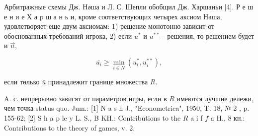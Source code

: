 \documentclass[10pt]{article}
\begin{document}
Арбитражные схемы Дж. Нәша и Л. С. Шепли обобщил Дж. Харшаньи [4]. Р е ш е н и е Х а p ш а н ь и, кроме соответствующих четырех аксиом Нәша, удовлетворяет еще двум аксиомам: 1) решение монотонно зависит от обоснованных требований игрока, 2) если $u^{*}$ и $u^{* *}$ - решения, то решением будет и $\vec{u}$,



\[

\overline{u_{i}} \geqslant \min _{i \in N}\left(u_{i}^{*}, u_{i}^{* *}\right),

\]



если төлько $\bar{u}$ принадлежит границе множества $R$.



A. с. непрерывно зависят от параметров игры, если в $R$ имеются лучшие дележи, чем точка status quo. Jum.: [1] N a s h J., "Econometrica", 1950, T. 18, № 2 , p. 155-62; [2] S h a p le y L. S., B KH.: Contributions to the $R$ a i f $f$ a H., 8 кн.: Contributions to the theory of games, v. 2,
\end{document}
